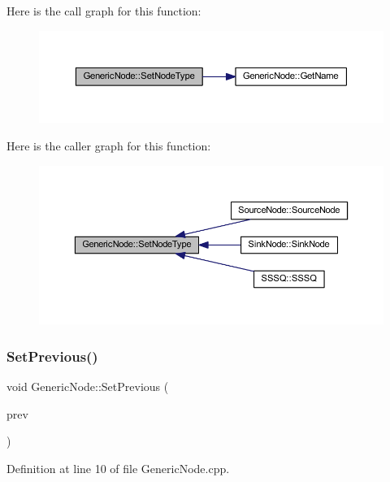 Here is the call graph for this function\+:
\nopagebreak
\begin{figure}[H]
\begin{center}
\leavevmode
\includegraphics[width=350pt]{class_generic_node_a793b15e284a17095c013015049628a03_cgraph}
\end{center}
\end{figure}
Here is the caller graph for this function\+:
\nopagebreak
\begin{figure}[H]
\begin{center}
\leavevmode
\includegraphics[width=350pt]{class_generic_node_a793b15e284a17095c013015049628a03_icgraph}
\end{center}
\end{figure}
\mbox{\label{class_generic_node_a3b03496c103efe7e504f77e22abf851d}} 
\subsubsection{\texorpdfstring{Set\+Previous()}{SetPrevious()}}
{\footnotesize\ttfamily void Generic\+Node\+::\+Set\+Previous (\begin{DoxyParamCaption}\item[{\hyperlink{class_generic_node}{Generic\+Node} $\ast$}]{prev }\end{DoxyParamCaption})}



Definition at line 10 of file Generic\+Node.\+cpp.



